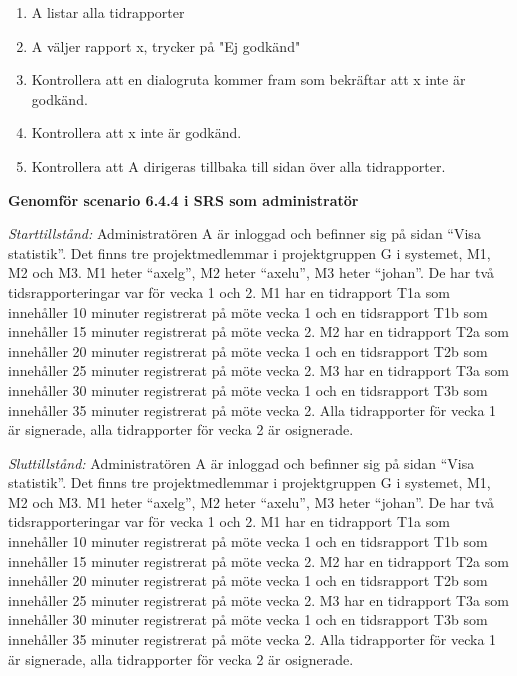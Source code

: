 \documentclass[a4paper]{article}
\begin{document}
\begin{ST}
\begin{enumerate}
\item A listar alla tidrapporter
\item A väljer rapport x, trycker på "Ej godkänd"
\item Kontrollera att en dialogruta kommer fram som bekräftar att x inte är godkänd.
\item Kontrollera att x inte är godkänd.
\item Kontrollera att A dirigeras tillbaka till sidan över alla tidrapporter.
\end{enumerate}

\item
\textbf{Genomför scenario 6.4.4 i SRS som administratör}

\emph{Starttillstånd:} Administratören A är inloggad och befinner sig på sidan ``Visa statistik''. Det finns tre projektmedlemmar i projektgruppen G i systemet, M1, M2 och M3. M1 heter ``axelg'', M2 heter ``axelu'', M3 heter ``johan''. De har två tidsrapporteringar var för vecka 1 och 2. M1 har en tidrapport T1a som innehåller 10 minuter registrerat på möte vecka 1 och en tidsrapport T1b som innehåller 15 minuter registrerat på möte vecka 2. M2 har en tidrapport T2a som innehåller 20 minuter registrerat på möte vecka 1 och en tidsrapport T2b som innehåller 25 minuter registrerat på möte vecka 2. M3 har en tidrapport T3a som innehåller 30 minuter registrerat på möte vecka 1 och en tidsrapport T3b som innehåller 35 minuter registrerat på möte vecka 2. Alla tidrapporter för vecka 1 är signerade, alla tidrapporter för vecka 2 är osignerade.

\emph{Sluttillstånd:} Administratören A är inloggad och befinner sig på sidan ``Visa statistik''. Det finns tre projektmedlemmar i projektgruppen G i systemet, M1, M2 och M3. M1 heter ``axelg'', M2 heter ``axelu'', M3 heter ``johan''. De har två tidsrapporteringar var för vecka 1 och 2. M1 har en tidrapport T1a som innehåller 10 minuter registrerat på möte vecka 1 och en tidsrapport T1b som innehåller 15 minuter registrerat på möte vecka 2. M2 har en tidrapport T2a som innehåller 20 minuter registrerat på möte vecka 1 och en tidsrapport T2b som innehåller 25 minuter registrerat på möte vecka 2. M3 har en tidrapport T3a som innehåller 30 minuter registrerat på möte vecka 1 och en tidsrapport T3b som innehåller 35 minuter registrerat på möte vecka 2. Alla tidrapporter för vecka 1 är signerade, alla tidrapporter för vecka 2 är osignerade.


\end{ST}
\end{document}
